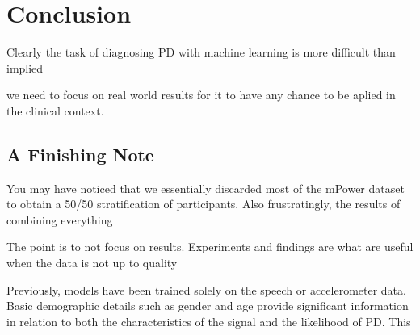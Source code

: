 \documentclass[12pt, twoside]{book}
\begin{document}
\chapter{Conclusion}
Clearly the task of diagnosing PD with machine learning is more difficult than implied

we need to focus on real world results for it to have any chance to be aplied in the clinical context.






\section{A Finishing Note}
You may have noticed that we essentially discarded most of the mPower dataset to obtain a 50/50 stratification of participants. Also frustratingly, the results of combining everything 

The point is to not focus on results. Experiments and findings are what are useful when the data is not up to quality 

Previously, models have been trained solely on the speech or accelerometer data. Basic demographic details such as gender and age provide significant information in relation to both the characteristics of the signal and the likelihood of PD. This 


\backmatter


\end{document}
